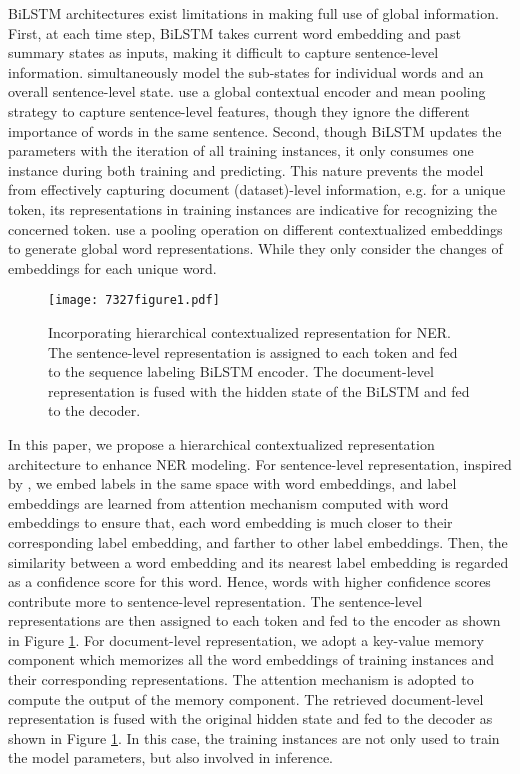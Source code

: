 \documentclass[letterpaper]{article} \usepackage{aaai20}  \usepackage{times}  \usepackage{helvet} \usepackage{courier}  \usepackage[hyphens]{url}  \usepackage{graphicx} \urlstyle{rm} \def\UrlFont{\rm}  \usepackage{graphicx}  \frenchspacing  \setlength{\pdfpagewidth}{8.5in}  \setlength{\pdfpageheight}{11in}
\begin{document}
BiLSTM architectures exist limitations in making full use of global information. First, at each time step, BiLSTM takes current word embedding and past summary states as inputs, making it difficult to capture sentence-level information. 
\cite{zhang2018sentence} simultaneously model the sub-states for individual words and an overall sentence-level state.  \cite{liu2019gcdt} use a global contextual encoder and mean pooling strategy to capture sentence-level features, though they ignore the different importance of words in the same sentence.
Second, though BiLSTM updates the parameters with the iteration of all training instances, it only consumes one instance during both training and predicting. This nature prevents the model from effectively capturing document (dataset)-level information, e.g. for a unique token, its representations in training instances are indicative for recognizing the concerned token.
\cite{akbik2019pooled} use a pooling operation on different contextualized embeddings to generate global word representations. While they only consider the changes of embeddings for each unique word.

\begin{figure}[!t]
  \centering 
  \texttt{[image: 7327figure1.pdf]}
    \caption{Incorporating hierarchical contextualized representation for NER. The sentence-level representation is assigned to each token and fed to the sequence labeling BiLSTM encoder. The document-level representation is fused with the hidden state of the BiLSTM and fed to the decoder.}\label{Overview}
\end{figure} 

In this paper, we propose a hierarchical contextualized representation architecture to enhance NER modeling. For sentence-level representation, inspired by \cite{wang2018joint}, we embed labels in the same space with word embeddings, and label embeddings are learned from attention mechanism computed with word embeddings to ensure that, each word embedding is much closer to their corresponding label embedding, and farther to other label embeddings. Then, the similarity between a word embedding and its nearest label embedding is regarded as a confidence score for this word. Hence, words with higher confidence scores contribute more to sentence-level representation. The sentence-level representations are then assigned to each token and fed to the encoder as shown in Figure \ref{Overview}. For document-level representation, we adopt a key-value memory component \cite{miller2016key} which memorizes all the word embeddings of training instances and their corresponding representations. The attention mechanism is adopted to compute the output of the memory component. The retrieved document-level representation is fused with the original hidden state and fed to the decoder as shown in Figure \ref{Overview}. In this case, the training instances are not only used to train the model parameters, but also involved in inference.
\end{document}
